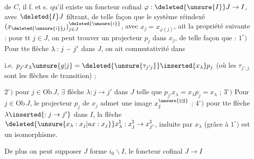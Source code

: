 %
%
de $C$, il f. et s. qu'il existe un foncteur cofinal $\varphi:\deleted{\unsure{I}}J\to I$, avec $\deleted{I}J$ filtrant, de telle façon que le système réindexé $(x_{\deleted{\unsure{i}}j})^{\deleted{\unsure{i}}}_{j\in J}$, avec $x_j=x_{\varphi(j)}$, ait la propriété suivante : pour tt $j\in J$, on peut trouver un projecteur $p_j$ dans $x_j$, de telle façon que : $1^\circ)$ Pour tte flèche $\lambda:j\mathrel{\relbar}j'$ dans $J$, on ait commutativité dans


i.e. $p_{j'}x_\lambda \unsure{g|j}=\deleted{\unsure{\tau_{j'j}}}\inserted{x_\lambda}p_j$ (où les $\tau_{j',j}$ sont les flèches de transition) ; 

$2^\circ)$ pour  $j\in\mathrm{Ob}\,J$, $\exists$ flèche $\lambda:j\longrightarrow j'$ dans $J$ telle que $p_{j'}x_\lambda=x_\lambda p_j=x_\lambda$ ; $3^\circ)$ Pour  $j\in\mathrm{Ob}\,J$, le projecteur $p_j$ de $x_j$ admet une image $x_j^{\unsure{\natural|\sharp}}$ ; $4^\circ)$  pour tte flèche $\lambda\inserted{:j\to j'}$ dans $I$, la flèche $\deleted{\unsure{x_\lambda:x_j|ax:x_j}}x_\lambda^\natural:x_j^\natural\to x_{j'}^\natural$, induite par $x_\lambda$ (grâce à $1^\circ)$ est un isomorphisme.

De plus  on peut supposer $J$  forme $i_0\backslash I$, le foncteur cofinal $J\to I$


